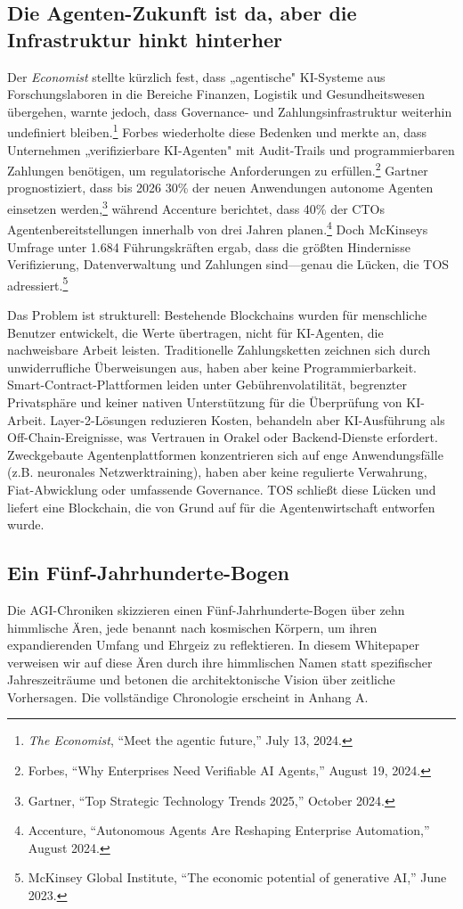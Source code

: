 \documentclass[11pt]{article}
\begin{document}
\subsection{Die Agenten-Zukunft ist da, aber die Infrastruktur hinkt hinterher}
Der \emph{Economist} stellte kürzlich fest, dass „agentische" KI-Systeme aus Forschungslaboren in die Bereiche Finanzen, Logistik und Gesundheitswesen übergehen, warnte jedoch, dass Governance- und Zahlungsinfrastruktur weiterhin undefiniert bleiben.\footnote{\emph{The Economist}, ``Meet the agentic future,'' July 13, 2024.} Forbes wiederholte diese Bedenken und merkte an, dass Unternehmen „verifizierbare KI-Agenten" mit Audit-Trails und programmierbaren Zahlungen benötigen, um regulatorische Anforderungen zu erfüllen.\footnote{Forbes, ``Why Enterprises Need Verifiable AI Agents,'' August 19, 2024.} Gartner prognostiziert, dass bis 2026 30\% der neuen Anwendungen autonome Agenten einsetzen werden,\footnote{Gartner, ``Top Strategic Technology Trends 2025,'' October 2024.} während Accenture berichtet, dass 40\% der CTOs Agentenbereitstellungen innerhalb von drei Jahren planen.\footnote{Accenture, ``Autonomous Agents Are Reshaping Enterprise Automation,'' August 2024.} Doch McKinseys Umfrage unter 1.684 Führungskräften ergab, dass die größten Hindernisse Verifizierung, Datenverwaltung und Zahlungen sind---genau die Lücken, die TOS adressiert.\footnote{McKinsey Global Institute, ``The economic potential of generative AI,'' June 2023.}

Das Problem ist strukturell: Bestehende Blockchains wurden für menschliche Benutzer entwickelt, die Werte übertragen, nicht für KI-Agenten, die nachweisbare Arbeit leisten. Traditionelle Zahlungsketten zeichnen sich durch unwiderrufliche Überweisungen aus, haben aber keine Programmierbarkeit. Smart-Contract-Plattformen leiden unter Gebührenvolatilität, begrenzter Privatsphäre und keiner nativen Unterstützung für die Überprüfung von KI-Arbeit. Layer-2-Lösungen reduzieren Kosten, behandeln aber KI-Ausführung als Off-Chain-Ereignisse, was Vertrauen in Orakel oder Backend-Dienste erfordert. Zweckgebaute Agentenplattformen konzentrieren sich auf enge Anwendungsfälle (z.B. neuronales Netzwerktraining), haben aber keine regulierte Verwahrung, Fiat-Abwicklung oder umfassende Governance. TOS schließt diese Lücken und liefert eine Blockchain, die von Grund auf für die Agentenwirtschaft entworfen wurde.

\subsection{Ein Fünf-Jahrhunderte-Bogen}
Die AGI-Chroniken skizzieren einen Fünf-Jahrhunderte-Bogen über zehn himmlische Ären, jede benannt nach kosmischen Körpern, um ihren expandierenden Umfang und Ehrgeiz zu reflektieren. In diesem Whitepaper verweisen wir auf diese Ären durch ihre himmlischen Namen statt spezifischer Jahreszeiträume und betonen die architektonische Vision über zeitliche Vorhersagen. Die vollständige Chronologie erscheint in Anhang A.
\end{document}
